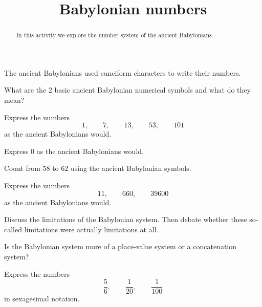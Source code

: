 \documentclass[handout,newpage]{ximera}
\title{Babylonian numbers}
\begin{document}
\begin{abstract}In this activity we explore the number system of the ancient
  Babylonians.
\end{abstract} 
\maketitle


The ancient Babylonians used cuneiform characters to write their
numbers.

\begin{exercise}
What are the 2 basic ancient Babylonian numerical symbols and what do
they mean?
\end{exercise}


\begin{exercise}
Express the numbers 
\[
1, \qquad 7,\qquad 13,\qquad 53,\qquad 101 
\]
as the ancient Babylonians would. 
\end{exercise}


\begin{question}
Express 0 as the ancient Babylonians would. 
\end{question}


\begin{question}
Count from 58 to 62 using the ancient Babylonian symbols. 
\end{question}



\begin{exploration}
Express the numbers 
\[
11,\qquad 660,\qquad 39600 
\]
as the ancient Babylonians would. 
\end{exploration}


\begin{exploration}
Discuss the limitations of the Babylonian system. Then debate whether
these so-called limitations were actually limitations at all.
\end{exploration}

\begin{exploration}
Is the Babylonian system more of a place-value system or a
concatenation system?
\end{exploration}



\begin{question}%
Express the numbers 
\[
\frac{5}{6}, \qquad \frac{1}{20},\qquad \frac{1}{100}
\]
in sexagesimal notation.
\end{question}
\end{document}

